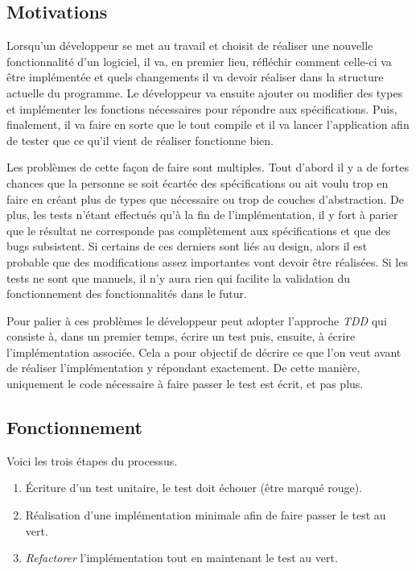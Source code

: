 \documentclass[journal, a4paper, frenchb]{IEEEtran}
\begin{document}
\subsection{Motivations}

Lorsqu'un développeur se met au travail et choisit de réaliser une nouvelle fonctionnalité d'un logiciel, il va, en premier lieu, réfléchir comment celle-ci va être implémentée et quels changements il va devoir réaliser dans la structure actuelle du programme. Le développeur va ensuite ajouter ou modifier des types et implémenter les fonctions nécessaires pour répondre aux spécifications. Puis, finalement, il va faire en sorte que le tout compile et il va lancer l'application afin de tester que ce qu'il vient de réaliser fonctionne bien.

Les problèmes de cette façon de faire sont multiples. Tout d'abord il y a de fortes chances que la personne se soit écartée des spécifications ou ait voulu trop en faire en créant plus de types que nécessaire ou trop de couches d'abstraction. De plus, les tests n'étant effectués qu'à la fin de l'implémentation, il y fort à parier que le résultat ne corresponde pas complètement aux spécifications et que des bugs subsistent. Si certains de ces derniers sont liés au design, alors il est probable que des modifications assez importantes vont devoir être réalisées. Si les tests ne sont que manuels, il n'y aura rien qui facilite la validation du fonctionnement des fonctionnalités dans le futur.

Pour palier à ces problèmes le développeur peut adopter l'approche \emph{TDD} qui consiste à, dans un premier temps, écrire un test puis, ensuite, à écrire l'implémentation associée. Cela a pour objectif de décrire ce que l'on veut avant de réaliser l'implémentation y répondant exactement. De cette manière, uniquement le code nécessaire à faire passer le test est écrit, et pas plus.


\subsection{Fonctionnement}

Voici les trois étapes du processus.

\begin{enumerate}
   \item Écriture d'un test unitaire, le test doit échouer (être marqué rouge).
   \item Réalisation d'une implémentation minimale afin de faire passer le test au vert.
   \item \emph{Refactorer} l'implémentation tout en maintenant le test au vert.
\end{enumerate}
\end{document}
